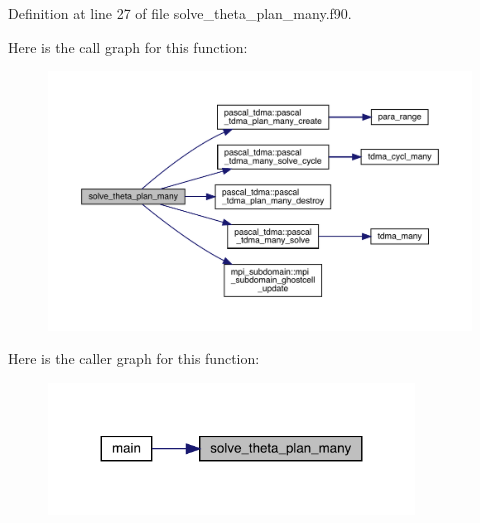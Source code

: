 Definition at line 27 of file solve\+\_\+theta\+\_\+plan\+\_\+many.\+f90.

Here is the call graph for this function\+:
\nopagebreak
\begin{figure}[H]
\begin{center}
\leavevmode
\includegraphics[width=350pt]{solve__theta__plan__many_8f90_af048018fcdfbe66e00922dee3e7e9a64_cgraph}
\end{center}
\end{figure}
Here is the caller graph for this function\+:
\nopagebreak
\begin{figure}[H]
\begin{center}
\leavevmode
\includegraphics[width=275pt]{solve__theta__plan__many_8f90_af048018fcdfbe66e00922dee3e7e9a64_icgraph}
\end{center}
\end{figure}
